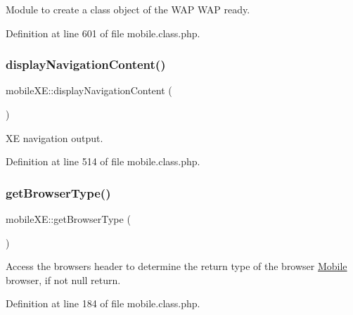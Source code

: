 Module to create a class object of the W\+AP W\+AP ready. 



Definition at line 601 of file mobile.\+class.\+php.

\hypertarget{classmobileXE_a76d2b1e71a4146580ebfae85f02d9644}{}\label{classmobileXE_a76d2b1e71a4146580ebfae85f02d9644} 
\subsubsection{\texorpdfstring{display\+Navigation\+Content()}{displayNavigationContent()}}
{\footnotesize\ttfamily mobile\+X\+E\+::display\+Navigation\+Content (\begin{DoxyParamCaption}{ }\end{DoxyParamCaption})}



XE navigation output. 



Definition at line 514 of file mobile.\+class.\+php.

\hypertarget{classmobileXE_a462a4900af63aa2bfbcea2168afbe876}{}\label{classmobileXE_a462a4900af63aa2bfbcea2168afbe876} 
\subsubsection{\texorpdfstring{get\+Browser\+Type()}{getBrowserType()}}
{\footnotesize\ttfamily mobile\+X\+E\+::get\+Browser\+Type (\begin{DoxyParamCaption}{ }\end{DoxyParamCaption})}



Access the browser\textquotesingle{}s header to determine the return type of the browser \hyperlink{classMobile}{Mobile} browser, if not null return. 



Definition at line 184 of file mobile.\+class.\+php.

\hypertarget{classmobileXE_a650f04e4701a5a1ae2ddceeb0f401166}{}\label{classmobileXE_a650f04e4701a5a1ae2ddceeb0f401166} 
